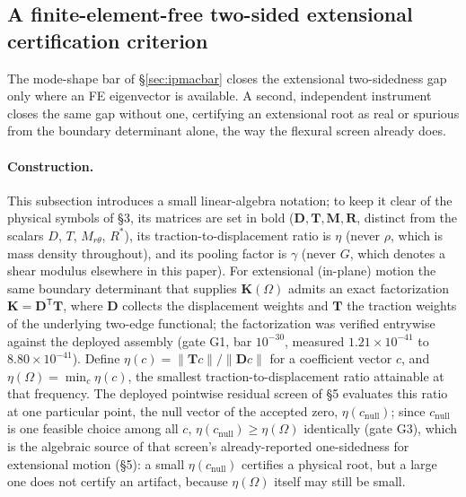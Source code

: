 \documentclass[11pt]{article}
\begin{document}
\subsection{A finite-element-free two-sided extensional certification
criterion}\label{sec:subdom}
The mode-shape bar of \S\ref{sec:ipmacbar} closes the extensional
two-sidedness gap only where an FE eigenvector is available. A second,
independent instrument closes the same gap without one, certifying an
extensional root as real or spurious from the boundary determinant alone,
the way the flexural screen already does.

\paragraph{Construction.} This subsection introduces a small linear-algebra
notation; to keep it clear of the physical symbols of \S3, its matrices are
set in bold ($\mathbf{D},\mathbf{T},\mathbf{M},\mathbf{R}$, distinct from the
scalars $D$, $T$, $M_{r\theta}$, $R^{*}$), its traction-to-displacement ratio
is $\eta$ (never $\rho$, which is mass density throughout), and its pooling
factor is $\gamma$ (never $G$, which denotes a shear modulus elsewhere in
this paper). For extensional (in-plane) motion the same
boundary determinant that supplies $\mathbf{K}(\Omega)$ admits an exact
factorization $\mathbf{K}=\mathbf{D}^{\mathsf T}\mathbf{T}$, where $\mathbf{D}$
collects the displacement
weights and $\mathbf{T}$ the traction weights of the underlying two-edge
functional; the factorization was verified entrywise against the deployed
assembly (gate G1, bar $10^{-30}$, measured $1.21\times10^{-41}$ to
$8.80\times10^{-41}$). Define
$\eta(c)=\|\mathbf{T}c\|/\|\mathbf{D}c\|$ for a coefficient vector $c$, and
$\eta(\Omega)=\min_{c}\eta(c)$, the smallest traction-to-displacement
ratio attainable at that frequency. The deployed pointwise
residual screen of \S5 evaluates this ratio at one particular point, the
null vector of the accepted zero, $\eta(c_{\mathrm{null}})$;
since $c_{\mathrm{null}}$ is one feasible choice among all $c$,
$\eta(c_{\mathrm{null}})\ge\eta(\Omega)$
identically (gate G3), which is the algebraic source of that screen's
already-reported one-sidedness for extensional motion (\S5): a small
$\eta(c_{\mathrm{null}})$
certifies a physical root, but a large one does not certify an artifact,
because $\eta(\Omega)$ itself may still be small.
\end{document}

